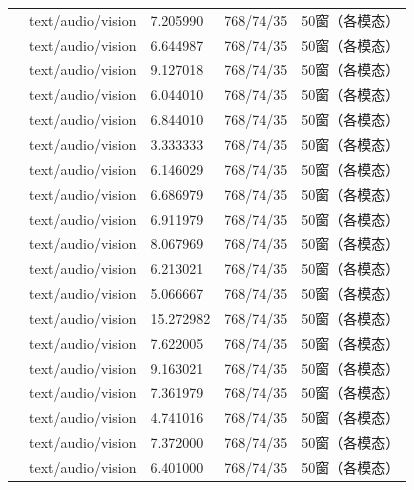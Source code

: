 \documentclass{gmcmthesis}
\begin{document}
\begin{longtable}{C{0.27\textwidth}C{0.16\textwidth}C{0.14\textwidth}C{0.14\textwidth}C{0.14\textwidth}}
\texttt{} & text/audio/vision & 7.205990 & 768/74/35 & 50窗（各模态） \\
\texttt{} & text/audio/vision & 6.644987 & 768/74/35 & 50窗（各模态） \\
\texttt{} & text/audio/vision & 9.127018 & 768/74/35 & 50窗（各模态） \\
\texttt{} & text/audio/vision & 6.044010 & 768/74/35 & 50窗（各模态） \\
\texttt{} & text/audio/vision & 6.844010 & 768/74/35 & 50窗（各模态） \\
\texttt{} & text/audio/vision & 3.333333 & 768/74/35 & 50窗（各模态） \\
\texttt{} & text/audio/vision & 6.146029 & 768/74/35 & 50窗（各模态） \\
\texttt{} & text/audio/vision & 6.686979 & 768/74/35 & 50窗（各模态） \\
\texttt{} & text/audio/vision & 6.911979 & 768/74/35 & 50窗（各模态） \\
\texttt{} & text/audio/vision & 8.067969 & 768/74/35 & 50窗（各模态） \\
\texttt{} & text/audio/vision & 6.213021 & 768/74/35 & 50窗（各模态） \\
\texttt{} & text/audio/vision & 5.066667 & 768/74/35 & 50窗（各模态） \\
\texttt{} & text/audio/vision & 15.272982 & 768/74/35 & 50窗（各模态） \\
\texttt{} & text/audio/vision & 7.622005 & 768/74/35 & 50窗（各模态） \\
\texttt{} & text/audio/vision & 9.163021 & 768/74/35 & 50窗（各模态） \\
\texttt{} & text/audio/vision & 7.361979 & 768/74/35 & 50窗（各模态） \\
\texttt{} & text/audio/vision & 4.741016 & 768/74/35 & 50窗（各模态） \\
\texttt{} & text/audio/vision & 7.372000 & 768/74/35 & 50窗（各模态） \\
\texttt{} & text/audio/vision & 6.401000 & 768/74/35 & 50窗（各模态） \\

\end{longtable}
\end{document}
